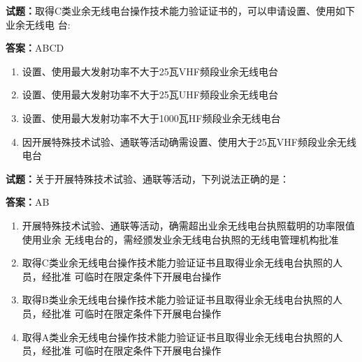\documentclass{ctexbook}
\begin{document}
\textbf{试题：}取得C类业余无线电台操作技术能力验证证书的，可以申请设置、使用如下业余无线电
台: 

\textbf{答案：}ABCD 

\begin{enumerate}[leftmargin=3em]
  \item 设置、使用最大发射功率不大于25瓦VHF频段业余无线电台 

  \item 设置、使用最大发射功率不大于25瓦UHF频段业余无线电台 

  \item 设置、使用最大发射功率不大于1000瓦HF频段业余无线电台 

  \item 因开展特殊技术试验、通联等活动确需设置、使用大于25瓦VHF频段业余无线电台 

\end{enumerate}





\vspace{1em}

\textbf{试题：}关于开展特殊技术试验、通联等活动，下列说法正确的是： 

\textbf{答案：}AB 

\begin{enumerate}[leftmargin=3em]
  \item 开展特殊技术试验、通联等活动，确需超出业余无线电台执照载明的功率限值使用业余
无线电台的，需经颁发业余无线电台执照的无线电管理机构批准 

  \item 取得C类业余无线电台操作技术能力验证证书且取得业余无线电台执照的人员，经批准
可临时在限定条件下开展电台操作 

  \item 取得B类业余无线电台操作技术能力验证证书且取得业余无线电台执照的人员，经批准
可临时在限定条件下开展电台操作 

  \item 取得A类业余无线电台操作技术能力验证证书且取得业余无线电台执照的人员，经批准
可临时在限定条件下开展电台操作 

\end{enumerate}





\vspace{1em}
\end{document}
